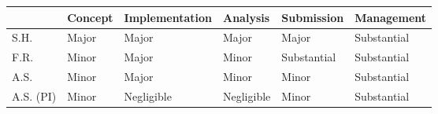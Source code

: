 \begin{table}[h!]
\begin{tabular}{l|l|l|l|l|l|}
\cline{2-6}
 \textbf{} & \textbf{Concept} & {\footnotesize \textbf{Implementation}} & \textbf{Analysis} & \textbf{Submission} & {\footnotesize \textbf{Management}} \\ \hline
\multicolumn{1}{|l|}{S.H.} & Major & Major & Major & Major & Substantial \\ \hline
\multicolumn{1}{|l|}{F.R.} & Minor & Major & Minor & Substantial & Substantial \\ \hline
\multicolumn{1}{|l|}{A.S.} & Minor & Major & Minor & Minor & Substantial \\ \hline
\multicolumn{1}{|l|}{A.S. (PI)} & Minor & Negligible & Negligible & Minor & Substantial \\ \hline
\end{tabular}
\end{table}



